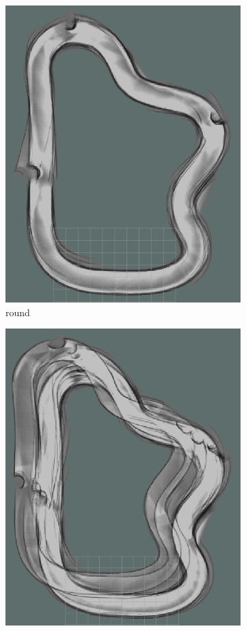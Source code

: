 \begin{figure}
\begin{subfigure}{.3\linewidth}
		\includegraphics[width=\textwidth]{Pictures/3slamtest4}
		\caption{ round}
	\end{subfigure}
	\begin{subfigure}{.3\linewidth}
		\includegraphics[width=\textwidth]{Pictures/3slamtest10}

\end{subfigure}
\end{figure}
